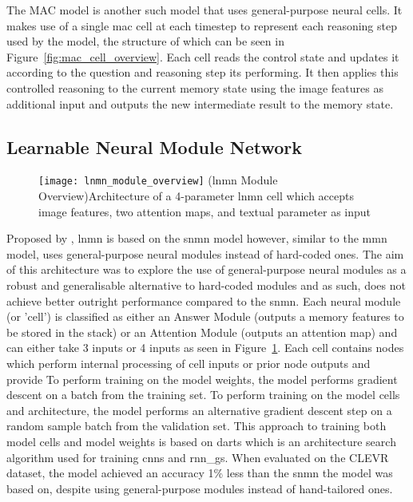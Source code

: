 The MAC model \cite{hudson_compositional_2018} is another such model that uses general-purpose neural cells.
It makes use of a single \gls{mac} cell at each timestep to represent each reasoning step used by the model, the structure of which can be seen in Figure~\ref{fig:mac_cell_overview}.
Each cell reads the control state and updates it according to the question and reasoning step its performing.
It then applies this controlled reasoning to the current memory state using the image features as additional input and outputs the new intermediate result to the memory state.

\subsection{Learnable Neural Module Network}
\label{subsec:learnable_neural_module_network}

\begin{figure}[htbp]
    \centering
    \texttt{[image: lnmn\_module\_overview]}
    \captionsource(\acrshort{lnmn} Module Overview){Architecture of a 4-parameter \acrshort{lnmn} cell which accepts image features, two attention maps, and textual parameter as input \label{fig:lnmn_module_overview}}{\citeauthor{pahuja_learning_2019}\cite{pahuja_learning_2019}}
\end{figure}

Proposed by \citeauthor{pahuja_learning_2019} \cite{pahuja_learning_2019}, \gls{lnmn} is based on the \gls{snmn} model however, similar to the \gls{mmn} model, uses general-purpose neural modules instead of hard-coded ones.
The aim of this architecture was to explore the use of general-purpose neural modules as a robust and generalisable alternative to hard-coded modules and as such, does not achieve better outright performance compared to the \gls{snmn}.
Each neural module (or 'cell') is classified as either an Answer Module (outputs a memory features to be stored in the stack) or an Attention Module (outputs an attention map) and can either take 3 inputs or 4 inputs as seen in Figure~\ref{fig:lnmn_module_overview}.
Each cell contains nodes which perform internal processing of cell inputs or prior node outputs and provide
To perform training on the model weights, the model performs gradient descent on a batch from the training set.
To perform training on the model cells and architecture, the model performs an alternative gradient descent step on a random sample batch from the validation set.
This approach to training both model cells and model weights is based on \gls{darts} which is an architecture search algorithm used for training \glspl{cnn} and \glspl{rnn_g}\cite{liu_darts_2019}.
When evaluated on the CLEVR dataset, the model achieved an accuracy 1\% less than the \gls{snmn} the model was based on, despite using general-purpose modules instead of hand-tailored ones.

